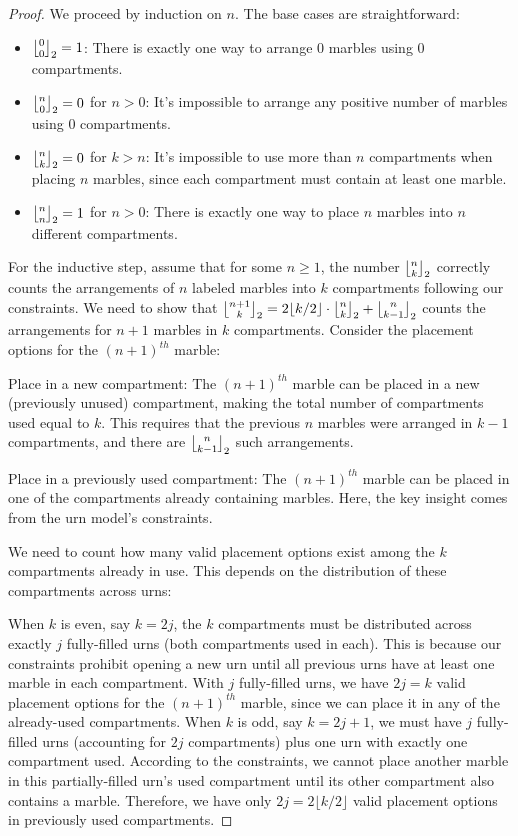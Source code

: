 \documentclass[a4paper]{amsart}
\newcommand{\mStirling}[0]{\genfrac{\lfloor}{\rfloor}{0pt}{}}
\begin{document}
\begin{proof}
We proceed by induction on $n$. The base cases are straightforward:
\begin{itemize}
\item $\mStirling{0}{0}_2 = 1$: There is exactly one way to arrange 0 marbles using 0 compartments.
\item $\mStirling{n}{0}_2 = 0$ for $n > 0$: It's impossible to arrange any positive number of marbles using 0 compartments.
\item $\mStirling{n}{k}_2 = 0$ for $k > n$: It's impossible to use more than $n$ compartments when placing $n$ marbles, since each compartment must contain at least one marble.
\item $\mStirling{n}{n}_2 = 1$ for $n > 0$: There is exactly one way to place $n$ marbles into $n$ different compartments.
\end{itemize}
For the inductive step, assume that for some $n \geq 1$, the number $\mStirling{n}{k}_2$ correctly counts the arrangements of $n$ labeled marbles into $k$ compartments following our constraints. We need to show that $\mStirling{n+1}{k}_2 = 2\lfloor k/2 \rfloor \cdot \mStirling{n}{k}_2 + \mStirling{n}{k-1}_2$ counts the arrangements for $n+1$ marbles in $k$ compartments.
Consider the placement options for the $(n+1)^{th}$ marble:

Place in a new compartment: The $(n+1)^{th}$ marble can be placed in a new (previously unused) compartment, making the total number of compartments used equal to $k$. This requires that the previous $n$ marbles were arranged in $k-1$ compartments, and there are $\mStirling{n}{k-1}_2$ such arrangements.

Place in a previously used compartment: The $(n+1)^{th}$ marble can be placed in one of the compartments already containing marbles. Here, the key insight comes from the urn model's constraints.

We need to count how many valid placement options exist among the $k$ compartments already in use. This depends on the distribution of these compartments across urns:

When $k$ is even, say $k = 2j$, the $k$ compartments must be distributed across exactly $j$ fully-filled urns (both compartments used in each). This is because our constraints prohibit opening a new urn until all previous urns have at least one marble in each compartment. With $j$ fully-filled urns, we have $2j = k$ valid placement options for the $(n+1)^{th}$ marble, since we can place it in any of the already-used compartments.
When $k$ is odd, say $k = 2j+1$, we must have $j$ fully-filled urns (accounting for $2j$ compartments) plus one urn with exactly one compartment used. According to the constraints, we cannot place another marble in this partially-filled urn's used compartment until its other compartment also contains a marble. Therefore, we have only $2j = 2\lfloor k/2 \rfloor$ valid placement options in previously used compartments.


\end{proof}
\end{document}
